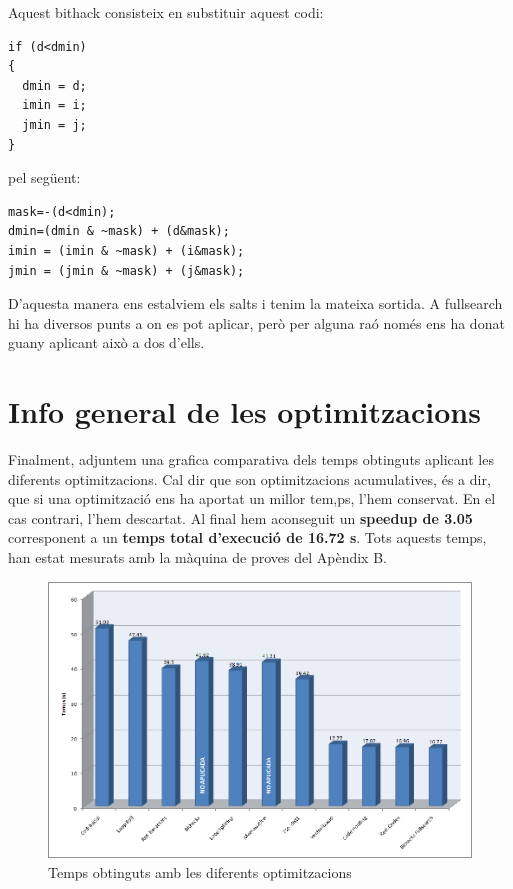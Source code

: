 Aquest bithack consisteix en substituir aquest codi:

\begin{lstlisting}
if (d<dmin)
{
  dmin = d;
  imin = i;
  jmin = j;
}
\end{lstlisting}

pel següent:

\begin{lstlisting}
mask=-(d<dmin);
dmin=(dmin & ~mask) + (d&mask);
imin = (imin & ~mask) + (i&mask);
jmin = (jmin & ~mask) + (j&mask);
\end{lstlisting}

D'aquesta manera ens estalviem els salts i tenim la mateixa sortida. A fullsearch hi ha diversos punts a on es pot aplicar, però per alguna raó només ens ha donat guany aplicant això a dos d'ells.

\section{Info general de les optimitzacions}

Finalment, adjuntem una grafica comparativa dels temps obtinguts aplicant les diferents optimitzacions. Cal dir que son optimitzacions acumulatives, és a dir, que si una optimització ens ha aportat un millor tem,ps, l'hem conservat. En el cas contrari, l'hem descartat. Al final hem aconseguit un \textbf{speedup de 3.05} corresponent a un \textbf{temps total d'execució de 16.72 s}. Tots aquests temps, han estat mesurats amb la màquina de proves del Apèndix B.


\begin{figure}[hbtp]
\begin{center}
\includegraphics[scale=0.4]{img/image001.png}
\caption{Temps obtinguts amb les diferents optimitzacions}
\end{center}
\end{figure}

